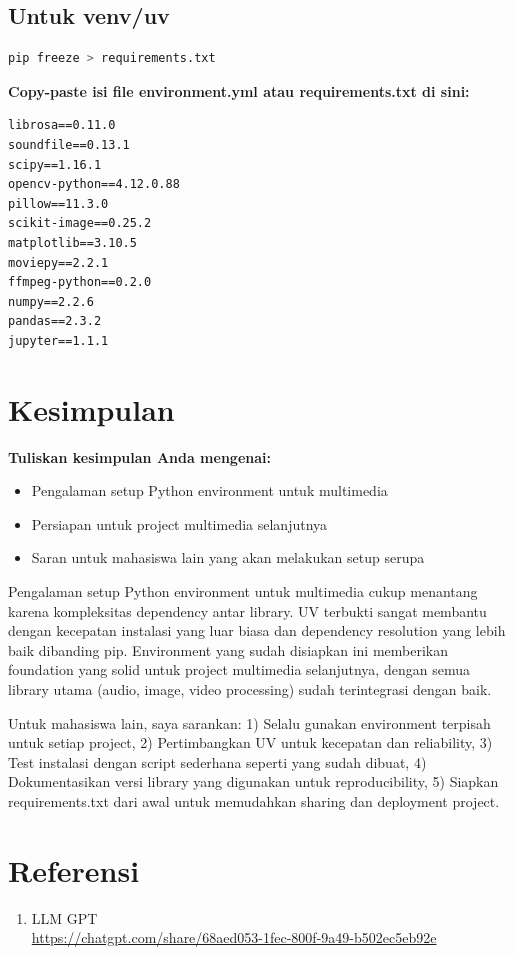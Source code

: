 \documentclass[11pt,a4paper]{article}
\begin{document}
\subsection{Untuk venv/uv}
\begin{lstlisting}[language=bash, caption=Export pip requirements]
pip freeze > requirements.txt
\end{lstlisting}

\textbf{Copy-paste isi file environment.yml atau requirements.txt di sini:}

\begin{lstlisting}[caption=Requirements.txt untuk UV Environment]
librosa==0.11.0          
soundfile==0.13.1        
scipy==1.16.1            
opencv-python==4.12.0.88 
pillow==11.3.0           
scikit-image==0.25.2     
matplotlib==3.10.5       
moviepy==2.2.1           
ffmpeg-python==0.2.0     
numpy==2.2.6             
pandas==2.3.2            
jupyter==1.1.1           

\end{lstlisting}

\section{Kesimpulan}
\textbf{Tuliskan kesimpulan Anda mengenai:}
\begin{itemize}
    \item Pengalaman setup Python environment untuk multimedia
    \item Persiapan untuk project multimedia selanjutnya
    \item Saran untuk mahasiswa lain yang akan melakukan setup serupa
\end{itemize}

Pengalaman setup Python environment untuk multimedia cukup menantang karena kompleksitas dependency antar library. UV terbukti sangat membantu dengan kecepatan instalasi yang luar biasa dan dependency resolution yang lebih baik dibanding pip. Environment yang sudah disiapkan ini memberikan foundation yang solid untuk project multimedia selanjutnya, dengan semua library utama (audio, image, video processing) sudah terintegrasi dengan baik.

Untuk mahasiswa lain, saya sarankan: 1) Selalu gunakan environment terpisah untuk setiap project, 2) Pertimbangkan UV untuk kecepatan dan reliability, 3) Test instalasi dengan script sederhana seperti yang sudah dibuat, 4) Dokumentasikan versi library yang digunakan untuk reproducibility, 5) Siapkan requirements.txt dari awal untuk memudahkan sharing dan deployment project.

\section{Referensi}
\begin{enumerate}
    \item LLM GPT \\
          \url{https://chatgpt.com/share/68aed053-1fec-800f-9a49-b502ec5eb92e}
    
\end{enumerate}
\end{document}
